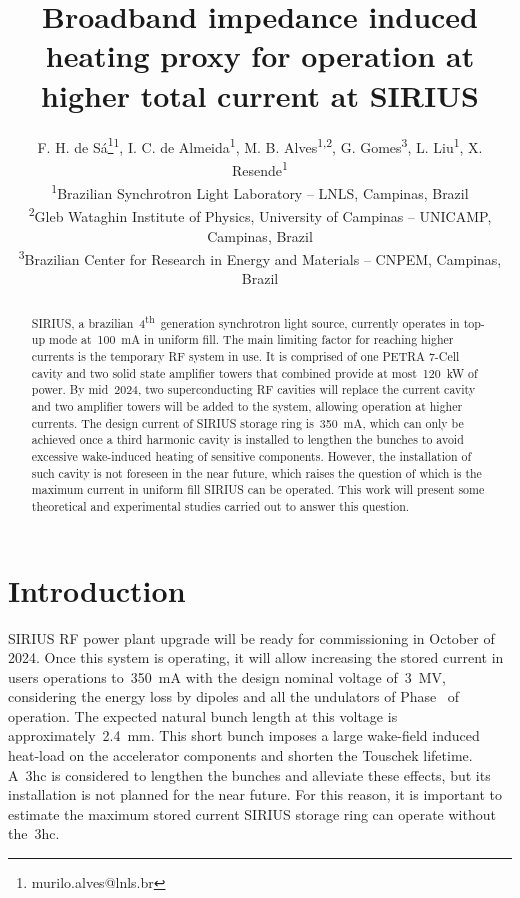 \documentclass
[
    a4paper,
]{jacow}
\newcommand*{\rom}[1]{\uppercase\expandafter{\romannumeral#1\relax}}
\begin{document}
\title{Broadband impedance induced heating proxy for operation at higher total current at SIRIUS}
\author
{
    F. H. de Sá\thanks{murilo.alves@lnls.br}\textsuperscript{1},
    I. C. de Almeida\textsuperscript{1},
    M. B. Alves\textsuperscript{1,2},
    G. Gomes\textsuperscript{3},
    L. Liu\textsuperscript{1},
    X. Resende\textsuperscript{1}\\
    \textsuperscript{1}Brazilian Synchrotron Light Laboratory -- LNLS, Campinas, Brazil\\
    \textsuperscript{2}Gleb Wataghin Institute of Physics, University of Campinas -- UNICAMP, Campinas, Brazil\\
    \textsuperscript{3}Brazilian Center for Research in Energy and Materials -- CNPEM, Campinas, Brazil
}
\maketitle

\begin{abstract}
    SIRIUS, a brazilian~4\textsuperscript{th}~generation synchrotron light source, currently operates in top-up mode at~\SI{100}{\milli\ampere} in uniform fill. The main limiting factor for reaching higher currents is the temporary RF system in use. It is comprised of one PETRA 7-Cell cavity and two solid state amplifier towers that combined provide at most~\SI{120}{\kilo\watt} of power. By mid~\num{2024}, two superconducting RF cavities will replace the current cavity and two amplifier towers will be added to the system, allowing operation at higher currents. The design current of SIRIUS storage ring is~\SI{350}{\milli\ampere}, which can only be achieved once a third harmonic cavity is installed to lengthen the bunches to avoid excessive wake-induced heating of sensitive components. However, the installation of such cavity is not foreseen in the near future, which raises the question of which is the maximum current in uniform fill SIRIUS can be operated. This work will present some theoretical and experimental studies carried out to answer this question.
\end{abstract} 

\section{Introduction}
    SIRIUS RF power plant upgrade will be ready for commissioning in October of 2024. Once this system is operating, it will allow increasing the stored current in users operations to~\SI{350}{\milli\ampere} with the design nominal voltage of~\SI{3}{\mega\volt}, considering the energy loss by dipoles and all the undulators of Phase~\rom{1} of operation. The expected natural bunch length at this voltage is approximately~\SI{2.4}{\milli\meter}. This short bunch imposes a large wake-field induced heat-load on the accelerator components and shorten the Touschek lifetime. A~\gls{3hc} is considered to lengthen the bunches and alleviate these effects, but its installation is not planned for the near future. For this reason, it is important to estimate the maximum stored current SIRIUS storage ring can operate without the~\gls{3hc}.
\end{document}

